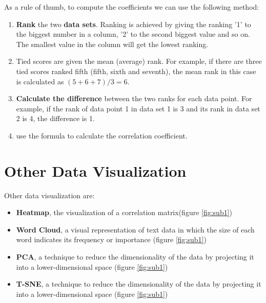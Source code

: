 As a rule of thumb, to compute the coefficients we can use the following 
method:
\begin{enumerate}
  \item \textbf{Rank} the two \textbf{data sets}. Ranking is achieved
    by giving the ranking '1' to the biggest number in a column, '2'
    to the second biggest value and so on. The smallest value in the
    column will get the lowest ranking.
  \item Tied scores are given the mean (average) rank. For example, if
    there are three tied scores ranked fifth (fifth, sixth and
    seventh), the mean rank in this case is calculated as $(5+6+7)/3 =
    6$.
  \item \textbf{Calculate the difference} between the two ranks for 
    each data point. For example, if the rank of data point 1 in data
    set 1 is 3 and its rank in data set 2 is 4, the difference is 1.
  \item use the formula to calculate the correlation coefficient.
\end{enumerate}


\section{Other Data Visualization}
Other data visualization are:
\begin{itemize}
  \item \textbf{Heatmap}, the visualization of a correlation
    matrix(figure \ref{fig:sub1})
  \item \textbf{Word Cloud}, a visual representation of text data in
    which the size of each word indicates its frequency or importance
    (figure \ref{fig:sub1})
  \item \textbf{PCA}, a technique to reduce the dimensionality of the
    data by projecting it into a lower-dimensional space (figure
    \ref{fig:sub1})
  \item \textbf{T-SNE}, a technique to reduce the dimensionality of
    the data by projecting it into a lower-dimensional space (figure
    \ref{fig:sub1})
\end{itemize}

